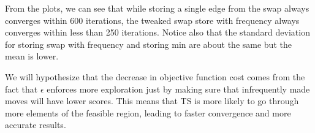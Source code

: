 From the plots, we can see that while storing a single edge from the swap always converges within 600 iterations, the tweaked swap store with frequency always converges within less than 250 iterations. Notice also that the standard deviation for storing swap with frequency and storing min are about the same but the mean is lower.

We will hypothesize that the decrease in objective function cost comes from the fact that \(\epsilon\) enforces more exploration just by making sure that infrequently made moves will have lower scores. This means that TS is more likely to go through more elements of the feasible region, leading to faster convergence and more accurate results.
